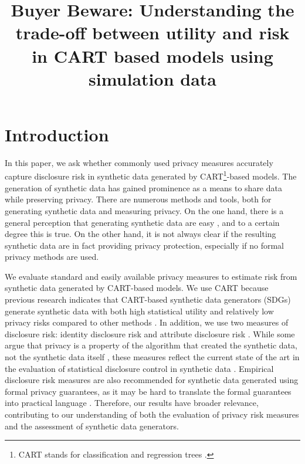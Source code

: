 \documentclass[a4paper,11pt]{style/uneceart}
\begin{document}


\title{Buyer Beware: Understanding the trade-off between utility and risk in CART based models using simulation data}

\section{Introduction}

In this paper, we ask whether commonly used privacy measures accurately capture disclosure risk in synthetic data generated by CART\footnote{CART stands for classification and regression trees \citep{breiman2017classification}.}-based models. The generation of synthetic data has gained prominence as a means to share data while preserving privacy. There are numerous methods and tools, both for generating synthetic data and measuring privacy.  On the one hand, there is a general perception that generating synthetic data are easy \citep{latner2024generating}, and to a certain degree this is true.  On the other hand, it is not always clear if the resulting synthetic data are in fact providing privacy protection, especially if no formal privacy methods are used.

We evaluate standard and easily available privacy measures to estimate risk from synthetic data generated by CART-based models.  We use CART because previous research indicates that CART-based synthetic data generators (SDGs) generate synthetic data with both high statistical utility and relatively low privacy risks compared to other methods \citep{little2025synthetic,fossing2024evaluation,dankar2021fake}.  In addition, we use two measures of disclosure risk: identity disclosure risk and attribute disclosure risk \citep{raab2025practicalprivacymetricssynthetic}.  While some argue that privacy is a property of the algorithm that created the synthetic data, not the synthetic data itself \citep{jordon2022synthetic}, these measures reflect the current state of the art in the evaluation of statistical disclosure control in synthetic data \citep{raab2025practicalprivacymetricssynthetic}.  Empirical disclosure risk measures are also recommended for synthetic data generated using formal privacy guarantees, as it may be hard to translate the formal guarantees into practical language \citep[see, e.g.,][]{desfontainesblog20250407}.  Therefore, our results have broader relevance, contributing to our understanding of both the evaluation of privacy risk measures and the assessment of synthetic data generators.
\end{document}
